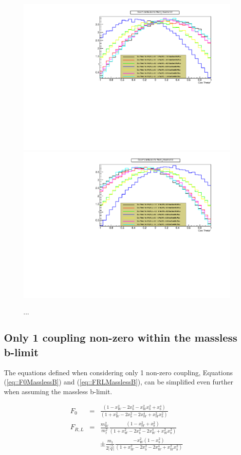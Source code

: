 \begin{figure}[h!]
 \centering
 \includegraphics[width = 0.45 \textwidth]{Afbeeldingen/Chapter_LinkWithTopWidth/CosThetaResults/RVLvsRVR/RVLRVR_CosTheta_RVLFixedTo02.pdf}
 \includegraphics[width = 0.45 \textwidth]{Afbeeldingen/Chapter_LinkWithTopWidth/CosThetaResults/RVLvsRVR/RVLRVR_CosTheta_RVRFixedTo02.pdf}
 \caption{...}
 \label{fig::CosThetaRVLRVR}
\end{figure}

\subsection{Only 1 coupling non-zero within the massless b-limit}

The equations defined when considering only 1 non-zero coupling, Equations (\ref{eq::F0MasslessB}) and (\ref{eq::FRLMasslessB}), can be simplified even further when assuming the massless b-limit.

\begin{eqnarray}
 F_{0}   & = & \frac{(1 - x_{W}^{2} - 2x_{b}^{2} -x_{W}^{2} x_{b}^{2} + x_{b}^{4})}{(1 + x_{W}^{2} - 2x_{b}^{2} - 2 x_{W}^{4} + x_{W}^{2} x_{b}^{2})} \\
 F_{R,L} & = & \frac{m_{W}^{2}}{m_{t}^{2}} \frac{(1 - x_{W}^{2} + x_{b}^{2})}{(1 + x_{W}^{2} - 2x_{b}^{2} - 2 x_{W}^{4} + x_{W}^{2} x_{b}^{2})} \nonumber \\
         &                                 & \pm \frac{m_{t}}{2 \vert \vec{q} \vert} \frac{ -x_{W}^{2} (1-x_{b}^{2})}{(1 + x_{W}^{2} - 2x_{b}^{2} - 2 x_{W}^{4} + x_{W}^{2} x_{b}^{2})} \label{eq::FRLMasslessB}
\end{eqnarray}

